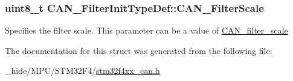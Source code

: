 \subsubsection[{C\+A\+N\+\_\+\+Filter\+Scale}]{\setlength{\rightskip}{0pt plus 5cm}uint8\+\_\+t C\+A\+N\+\_\+\+Filter\+Init\+Type\+Def\+::\+C\+A\+N\+\_\+\+Filter\+Scale}\label{struct_c_a_n___filter_init_type_def_a9d52661aca538dbfcafdda6f16dddc82}
Specifies the filter scale. This parameter can be a value of \hyperlink{group___c_a_n__filter__scale}{C\+A\+N\+\_\+filter\+\_\+scale} 

The documentation for this struct was generated from the following file\+:\begin{DoxyCompactItemize}
\item 
\+\_\+hide/\+M\+P\+U/\+S\+T\+M32\+F4/\hyperlink{stm32f4xx__can_8h}{stm32f4xx\+\_\+can.\+h}\end{DoxyCompactItemize}
